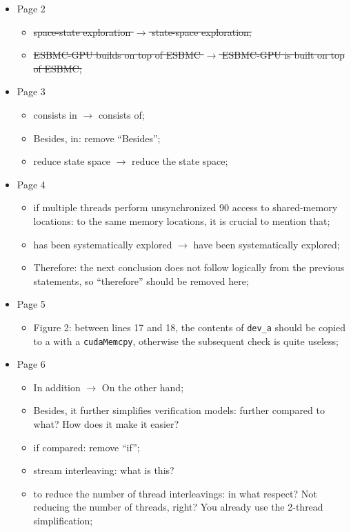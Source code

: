 \documentclass[12pt]{article}
\begin{document}
\begin{itemize}
\item Page 2
  \begin{itemize}
  \item \sout{space-state exploration $\rightarrow$ state-space exploration;}
  \item \sout{ESBMC-GPU builds on top of ESBMC $\rightarrow$ ESBMC-GPU is built on top of ESBMC;}
  \end{itemize}
\item Page 3
  \begin{itemize}
  \item consists in $\rightarrow$ consists of;
  \item Besides, in: remove ``Besides'';
  \item reduce state space $\rightarrow$ reduce the state space;
  \end{itemize}
\item Page 4
  \begin{itemize}
  \item if multiple threads perform unsynchronized 90 access to shared-memory locations: to the same memory locations, it is crucial to mention that;
  \item has been systematically explored $\rightarrow$ have been systematically explored;
  \item Therefore: the next conclusion does not follow logically from the previous statements, so ``therefore'' should be removed here;
  \end{itemize}
\item Page 5
  \begin{itemize}
  \item Figure 2: between lines 17 and 18, the contents of {\tt dev\_a} should be copied to a with a {\tt cudaMemcpy}, otherwise the subsequent check is quite useless;
  \end{itemize}
\item Page 6
  \begin{itemize}
  \item In addition $\rightarrow$ On the other hand;
  \item Besides, it further simplifies verification models: further compared to what? How does it make it easier?
  \item if compared: remove ``if'';
  \item stream interleaving: what is this?
  \item  to reduce the number of thread interleavings: in what respect? Not reducing the number of threads, right? You already use the 2-thread simplification;
  \end{itemize}
\end{itemize}
\end{document}
